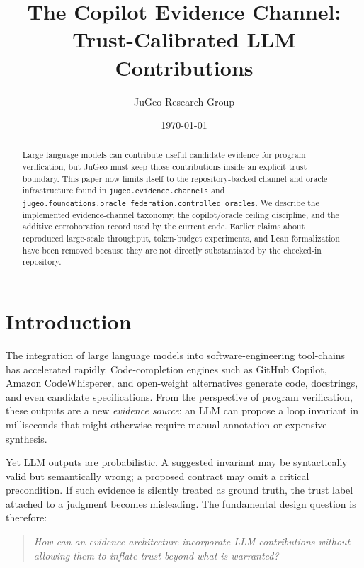 \documentclass[11pt]{article}
\title{\textbf{The Copilot Evidence Channel:\\
Trust-Calibrated LLM Contributions}}
\author{%
  JuGeo Research Group
}
\date{\today}
\begin{document}
\maketitle

\begin{abstract}
Large language models can contribute useful candidate evidence for
program verification, but JuGeo must keep those contributions inside an
explicit trust boundary.  This paper now limits itself to the
repository-backed channel and oracle infrastructure found in
\texttt{jugeo.evidence.channels} and
\texttt{jugeo.foundations.oracle\_federation.controlled\_oracles}.  We
describe the implemented evidence-channel taxonomy, the copilot/oracle
ceiling discipline, and the additive corroboration record used by the
current code.  Earlier claims about reproduced large-scale throughput,
token-budget experiments, and Lean formalization have been removed
because they are not directly substantiated by the checked-in
repository.
\end{abstract}

\section{Introduction}
\label{sec:intro}

The integration of large language models into software-engineering
tool-chains has accelerated rapidly.  Code-completion engines such
as GitHub Copilot, Amazon CodeWhisperer, and open-weight alternatives
generate code, docstrings, and even candidate specifications.  From
the perspective of program verification, these outputs are a new
\emph{evidence source}: an LLM can propose a loop invariant in
milliseconds that might otherwise require manual annotation or
expensive synthesis.

Yet LLM outputs are probabilistic.  A suggested invariant may be
syntactically valid but semantically wrong; a proposed contract may
omit a critical precondition.  If such evidence is silently treated
as ground truth, the trust label attached to a judgment becomes
misleading.  The fundamental design question is therefore:

\begin{quote}
\emph{How can an evidence architecture incorporate LLM contributions
without allowing them to inflate trust beyond what is warranted?}
\end{quote}
\end{document}
